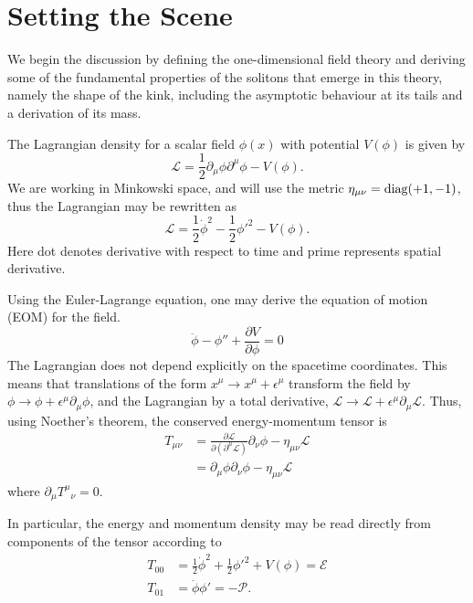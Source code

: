 \documentclass[11pt, oneside]{article}  	%
\numberwithin{equation}{section}
\begin{document}
\section{Setting the Scene} \label{set_scene}
We begin the discussion by defining the  one-dimensional field theory and deriving some of the fundamental properties of the solitons that emerge in this theory, namely the shape of the kink, including the asymptotic behaviour at its tails and a derivation of its mass.\par
The Lagrangian density for a scalar field $\phi(x)$ with potential $V(\phi)$ is given by
\begin{equation}\label{lagrangian}
\mathcal{L} = \frac{1}{2} \partial_\mu \phi \partial^\mu \phi  - V(\phi).
\end{equation} 
We are working in Minkowski space, and will use the metric $\eta_{\mu\nu} = \textup{diag}(+1,-1)$, thus the Lagrangian may be rewritten as
\begin{equation}
\mathcal{L} = \frac{1}{2}\dot{\phi}^2 -  \frac{1}{2}{\phi'}^2   - V(\phi).
\end{equation}
Here dot denotes derivative with respect to time and prime represents spatial derivative.\par
Using the Euler-Lagrange equation, one may derive the equation of motion (EOM) for the field.
\begin{equation}\label{EOM}
\ddot{\phi} - {\phi}'' + \frac{\partial V}{\partial \phi} = 0
\end{equation}
The Lagrangian does not depend explicitly on the spacetime coordinates. This means that translations of the form $x^\mu \rightarrow x^\mu + \epsilon ^\mu$ transform the field by $\phi \rightarrow \phi + \epsilon^\mu \partial_\mu \phi$, and the Lagrangian by a total derivative, $\mathcal{L}\rightarrow \mathcal{L} + \epsilon^\mu \partial_\mu \mathcal{L}$. Thus, using Noether's theorem, the conserved energy-momentum tensor is
\begin{align}
T_{\mu \nu} &= \frac{\partial \mathcal{L}}{\partial \left (\partial^\mu \mathcal{L}\right )} \partial_\nu\phi - \eta_{\mu\nu} \mathcal{L}  \nonumber \\
&=  \partial_\mu\phi \partial_\nu\phi - \eta_{\mu\nu} \mathcal{L}  
\end{align}
where $\partial_{\mu}{T^{\mu}}_{\nu} = 0$.\par
In particular, the energy and momentum density may be read directly from components of the tensor according to
 \begin{align}
T_{00} &= \frac{1}{2}\dot{\phi}^2 +  \frac{1}{2}{\phi'}^2   +V(\phi) = \mathcal{E} \label{energy}\\
T_{01} &= \dot{\phi} \phi'  = -\mathcal{P}. \label{momentum}
\end{align}\par
\end{document}
